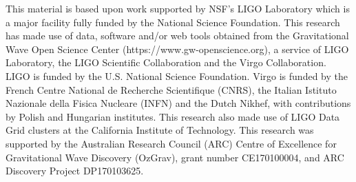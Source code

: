 \documentclass[pra,superscriptaddress,reprint,amsmath,amssymb,nofootinbib]{revtex4-2}
\begin{document}
\begin{acknowledgements}
This material is based upon work supported by NSF's LIGO Laboratory which is a major facility fully funded by the National Science Foundation. This research has made use of data, software and/or web tools obtained from the Gravitational Wave Open Science Center (https://www.gw-openscience.org), a service of LIGO Laboratory, the LIGO Scientific Collaboration and the Virgo Collaboration. LIGO is funded by the U.S. National Science Foundation. Virgo is funded by the French Centre National de Recherche Scientifique (CNRS), the Italian Istituto Nazionale della Fisica Nucleare (INFN) and the Dutch Nikhef, with contributions by Polish and Hungarian institutes. This research also
made use of LIGO Data Grid clusters at the California Institute of Technology. This research was supported by
the Australian Research Council (ARC) Centre of Excellence for Gravitational Wave Discovery (OzGrav), grant number CE170100004, and ARC Discovery Project DP170103625.
\end{acknowledgements}
\end{document}
